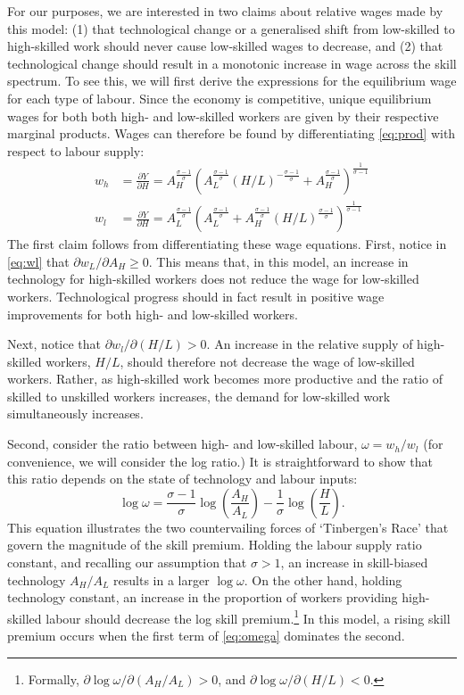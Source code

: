 \documentclass[a4paper,11pt]{article}
\begin{document}
For our purposes, we are interested in two claims about relative wages made by this model: (1) that technological change or a generalised shift from low-skilled to high-skilled work should never cause low-skilled wages to decrease, and (2) that technological change should result in a monotonic increase in wage across the skill spectrum. To see this, we will first derive the expressions for the equilibrium wage for each type of labour. Since the economy is competitive, unique equilibrium wages for both both high- and low-skilled workers are given by their respective marginal products. Wages can therefore be found by differentiating \eqref{eq:prod} with respect to labour supply:
\begin{align}
w_h &= \frac{\partial Y}{\partial H} 
     = A_H^\frac{\sigma-1}{\sigma}\left(
              A_L^{\frac{\sigma-1}{\sigma}} (H/L)^{-\frac{\sigma-1}{\sigma}} + A_H^{\frac{\sigma-1}{\sigma}}
        \right)^{\frac{1}{\sigma - 1}} \label{eq:wh} \\
w_l &= \frac{\partial Y}{\partial H} 
     = A_L^\frac{\sigma-1}{\sigma}\left(
              A_L^{\frac{\sigma-1}{\sigma}} + A_H^{\frac{\sigma-1}{\sigma}}(H/L)^{\frac{\sigma-1}{\sigma}}
        \right)^{\frac{1}{\sigma - 1}} \label{eq:wl}
\end{align}
The first claim follows from differentiating these wage equations. First, notice in \eqref{eq:wl} that $\partial w_L/\partial A_H \geq 0$. This means that, in this model, an increase in technology for high-skilled workers does not reduce the wage for low-skilled workers. Technological progress should in fact result in positive wage improvements for both high- and low-skilled workers. 

Next, notice that $\partial w_l/\partial(H/L)>0$. An increase in the relative supply of high-skilled workers, $H/L$, should therefore not decrease the wage of low-skilled workers. Rather, as high-skilled work becomes more productive and the ratio of skilled to unskilled workers increases, the demand for low-skilled work simultaneously increases. 

Second, consider the ratio between high- and low-skilled labour, $\omega=w_h/w_l$ (for convenience, we will consider the log ratio.) It is straightforward to show that this ratio depends on the state of technology and labour inputs:
\begin{equation}\label{eq:omega}
\log \omega = \frac{\sigma-1}{\sigma}\log\left(\frac{A_H}{A_L}\right) - \frac{1}{\sigma}\log\left(\frac{H}{L}\right).
\end{equation}
This equation illustrates the two countervailing forces of `Tinbergen's Race' that govern the magnitude of the skill premium. Holding the labour supply ratio constant, and recalling our assumption that $\sigma >1$, an increase in skill-biased technology $A_H/A_L$ results in a larger $\log\omega$. On the other hand, holding technology constant, an increase in the proportion of workers providing high-skilled labour should decrease the log skill premium.\footnote{Formally, $\partial \log\omega / \partial(A_H/A_L) > 0$, and 
$\partial \log\omega / \partial(H/L) < 0$.} In this model, a rising skill premium occurs when the first term of \eqref{eq:omega}  dominates the second.
\end{document}
